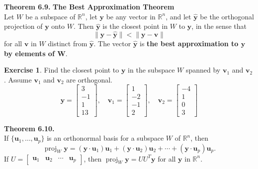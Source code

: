\documentclass[10pt]{book}
\newcommand{\boxcolor}{gray!30}
\newenvironment{boxthm}{\begin{mdframed}[backgroundcolor=\boxcolor,nobreak=true]}{\end{mdframed}}
\theoremstyle{definition}
\newtheorem{exercise}{Exercise}[section]
\newcommand{\R}{\mathbb{R}}
\newcommand{\vect}[1]{\ensuremath{\boldsymbol{\mathbf{#1}}}}
\DeclareMathOperator{\proj}{proj}
\newcommand{\vectset}[3][v]{\{\vect{#1}_{#2},\ldots,\vect{#1}_{#3}\}}
\newcommand{\yhat}{\hat{\vect{y}}}
\begin{document}
\newpage


\begin{boxthm}
	\textbf{Theorem 6.9.}
	\textbf{The Best Approximation Theorem} \\
	Let $W$ be a subspace of $\R^n$, let $\vect{y}$ be any vector in $\R^n$, and let $\yhat$ be the orthogonal projection of $\vect{y}$ onto $W$. Then $\yhat$ is the closest point in $W$ to $\vect{y}$, in the sense that
	$$ \|\vect{y}-\yhat\| < \|\vect{y}-\vect{v}\| $$
	for all $\vect{v}$ in $W$ distinct from $\yhat$. The vector $\yhat$ is \textbf{the best approximation to $\boldsymbol{\vect{y}}$ by elements of $\boldsymbol{W}$}.
\end{boxthm}


\begin{exercise} %
	Find the closest point to $\vect{y}$ in the subspace $W$ spanned by $\vect{v}_1$ and $\vect{v}_2$. Assume $\vect{v}_1$ and $\vect{v}_2$ are orthogonal.
	$$ \vect{y} = \begin{bmatrix}3\\-1\\1\\13\end{bmatrix}, \quad
	\vect{v}_1 = \begin{bmatrix}1\\-2\\-1\\2\end{bmatrix}, \quad
	\vect{v}_2 = \begin{bmatrix}-4\\1\\0\\3\end{bmatrix} $$
\end{exercise}
\vfill


\begin{boxthm}
	\textbf{Theorem 6.10.} \\
	If $\vectset[u]{1}{p}$ is an orthonormal basis for a subspace $W$ of $\R^n$, then
	$$ \proj_W\vect{y} = (\vect{y}\cdot\vect{u}_1)\vect{u}_1 + (\vect{y}\cdot\vect{u}_2)\vect{u}_2 + \cdots + (\vect{y}\cdot\vect{u}_p)\vect{u}_p. $$
	If $U=\begin{bmatrix}\vect{u}_1&\vect{u}_2&\cdots&\vect{u}_p\end{bmatrix}$, then
	$ \proj_W\vect{y} = UU^T\vect{y}$ for all $\vect{y}$ in $\R^n$.
\end{boxthm}
\end{document}
